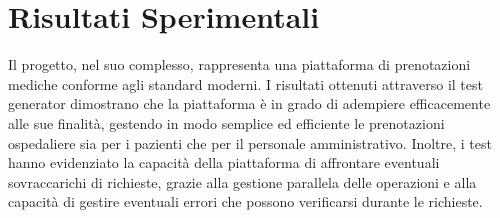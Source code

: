 \documentclass[12pt]{report}
\begin{document}
\section{Risultati Sperimentali}
    Il progetto, nel suo complesso, rappresenta una piattaforma di prenotazioni mediche conforme agli standard moderni. I risultati ottenuti attraverso il test generator dimostrano che la piattaforma è in grado di adempiere efficacemente alle sue finalità, gestendo in modo semplice ed efficiente le prenotazioni ospedaliere sia per i pazienti che per il personale amministrativo. Inoltre, i test hanno evidenziato la capacità della piattaforma di affrontare eventuali sovraccarichi di richieste, grazie alla gestione parallela delle operazioni e alla capacità di gestire eventuali errori che possono verificarsi durante le richieste.  
\end{document}
